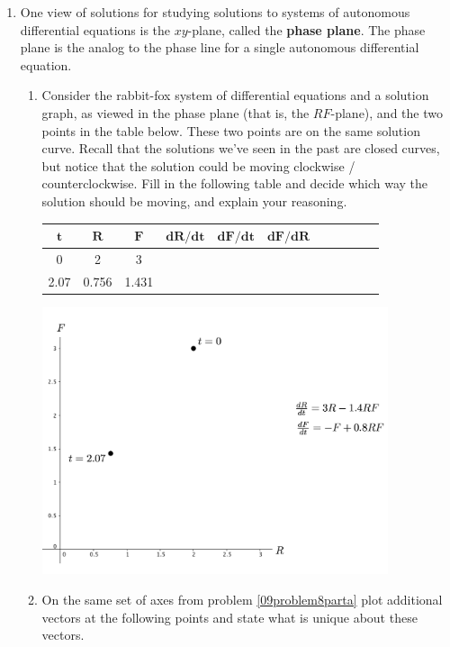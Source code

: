 \begin{enumerate}
\clearpage
\item One view of solutions for studying solutions to systems of autonomous differential equations is the $xy$-plane, called the \textbf{phase plane}. The phase plane is the analog to the phase line for a single autonomous differential equation. \label{09problem8} 

\begin{enumerate}
\item Consider the rabbit-fox system of differential equations and a solution graph, as viewed in the phase plane (that is, the $RF$-plane), and the two points in the table below. These two points are on the same solution curve. Recall that the solutions we've seen in the past are closed curves, but notice that the solution could be moving clockwise / counterclockwise. Fill in the following table and decide which way the solution should be moving, and explain your reasoning. \label{09problem8parta}	

\begin{center}
\renewcommand{\arraystretch}{2}
\begin{tabular}{|c|c|c|c|c|cccccc|}
\hline
$\mathbf{t}$ & $\mathbf{R}$ & $\mathbf{F}$ & $\mathbf{dR/dt} $ & $\mathbf{dF/dt}$ & $\mathbf{dF/dR}$ & & & & & \\ \hline

0 & 2 & 3 & & & & & & & & \\ \hline
2.07 & 0.756 & 1.431 & & & & & & & & \\ \hline
\end{tabular}

\includegraphics[width=4in]{11/11Clockwise.png}
\end{center}

\item	On the same set of axes from problem \ref{09problem8parta} plot additional vectors at the following points and state what is unique about these vectors. \label{09problem8partb}


\end{enumerate}
\end{enumerate}
